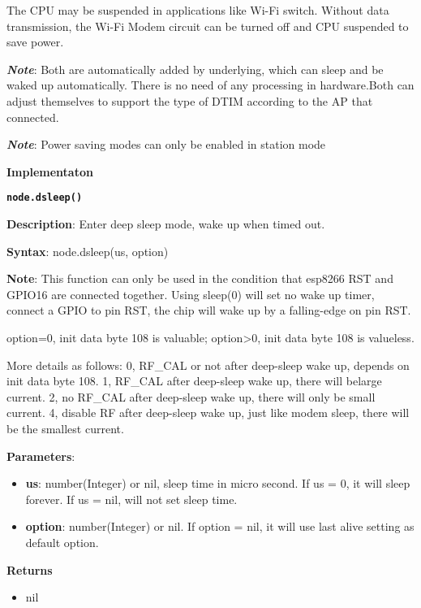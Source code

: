 \documentclass[16pt]{article}
\begin{document}
The CPU may be suspended in applications like Wi-Fi switch. Without data
transmission, the Wi-Fi Modem circuit can be turned off and CPU
suspended to save power.

\textbf{\emph{Note}}: Both are automatically added by underlying, which
can sleep and be waked up automatically. There is no need of any
processing in hardware.Both can adjust themselves to support the type of
DTIM according to the AP that connected.

\textbf{\emph{Note}}: Power saving modes can only be enabled in station
mode

{\Large{\textbf{Implementaton}}}

\textbf{\texttt{node.dsleep()}}

\textbf{Description}: Enter deep sleep mode, wake up when timed out.

\textbf{Syntax}: node.dsleep(us, option)

\textbf{Note}: This function can only be used in the condition that
esp8266 RST and GPIO16 are connected together. Using sleep(0) will set
no wake up timer, connect a GPIO to pin RST, the chip will wake up by a
falling-edge on pin RST.

option=0, init data byte 108 is valuable; option\textgreater{}0, init
data byte 108 is valueless.

More details as follows: 0, RF\_CAL or not after deep-sleep wake up,
depends on init data byte 108. 1, RF\_CAL after deep-sleep wake up,
there will belarge current. 2, no RF\_CAL after deep-sleep wake up,
there will only be small current. 4, disable RF after deep-sleep wake
up, just like modem sleep, there will be the smallest current.

\textbf{Parameters}:

\begin{itemize}

\item
  \textbf{us}: number(Integer) or nil, sleep time in micro second. If us
  = 0, it will sleep forever. If us = nil, will not set sleep time.
\item
  \textbf{option}: number(Integer) or nil. If option = nil, it will use
  last alive setting as default option.
\end{itemize}

\textbf{Returns}

\begin{itemize}

\item
  nil
\end{itemize}
\end{document}

